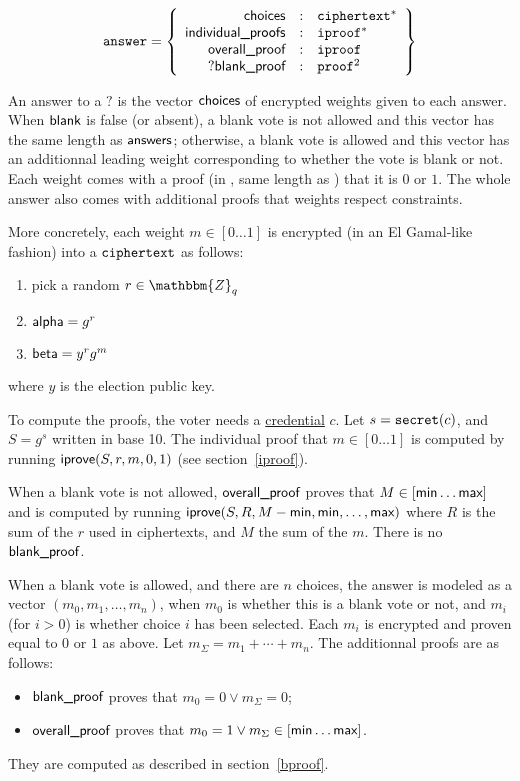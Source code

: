 \documentclass[a4paper]{article}
\newcommand{\Z}{\mathbbm{Z}}
\begin{document}
\begin{gather*}
  \texttt{answer}=\left\{
    \begin{array}{rcl}
      \textsf{choices}&:&\texttt{ciphertext}^\ast\\
      \textsf{individual\_proofs}&:&\texttt{iproof}^\ast\\
      \textsf{overall\_proof}&:&\texttt{iproof}\\
      ?\textsf{blank\_proof}&:&\texttt{proof}^2
    \end{array}
  \right\}
\end{gather*}

An answer to a \hyperref[elections]{$\question$} is the vector
$\textsf{choices}$ of encrypted weights given to each answer. When $\textsf{blank}$ is
false (or absent), a blank vote is not allowed and this vector has the
same length as $\textsf{answers}$; otherwise, a blank vote is allowed and this
vector has an additionnal leading weight corresponding to whether the
vote is blank or not.  Each weight comes with a proof (in \iproofs,
same length as \choices) that it is $0$ or $1$. The whole answer also
comes with additional proofs that weights respect constraints.

More concretely, each weight $m\in[0\dots1]$ is encrypted (in an El
Gamal-like fashion) into a $\texttt{ciphertext}$ as follows:
\begin{enumerate}
\item pick a random $r\in\Z_q$
\item $\textsf{alpha}=g^r$
\item $\textsf{beta}=y^rg^m$
\end{enumerate}
where $y$ is the election public key.

To compute the proofs, the voter needs a
\hyperref[credentials]{credential} $c$. Let $s=\texttt{secret}(c)$, and
$S=g^s$ written in base 10. The individual proof that $m\in[0\dots1]$
is computed by running $\textsf{iprove}(S,r,m,0,1)$ (see
section~\ref{iproof}).

When a blank vote is not allowed, $\textsf{overall\_proof}$ proves that
$M\in[\textsf{min}\dots\textsf{max}]$ and is computed by running
$\textsf{iprove}(S,R,M-\textsf{min},\textsf{min},\dots,\textsf{max})$ where $R$ is the
sum of the $r$ used in ciphertexts, and $M$ the sum of the $m$. There
is no $\textsf{blank\_proof}$.

When a blank vote is allowed, and there are $n$ choices, the answer is
modeled as a vector $(m_0,m_1,\dotsc,m_n)$, when $m_0$ is whether this
is a blank vote or not, and $m_i$ (for $i>0$) is whether choice $i$
has been selected. Each $m_i$ is encrypted and proven equal to $0$ or
$1$ as above. Let $m_\Sigma=m_1+\dotsb+m_n$. The additionnal proofs
are as follows:
\begin{itemize}
\item $\textsf{blank\_proof}$ proves that $m_0=0\lor m_\Sigma=0$;
\item $\textsf{overall\_proof}$ proves that $m_0=1\lor m_\Sigma\in[\textsf{min}\dots\textsf{max}]$.
\end{itemize}
They are computed as described in section~\ref{bproof}.
\end{document}
